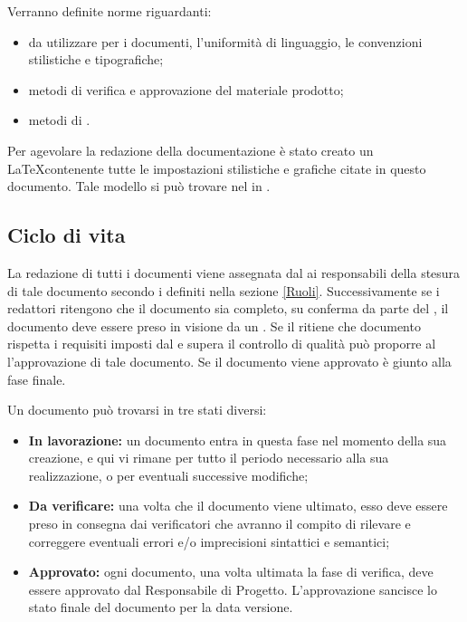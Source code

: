 \documentclass[12pt,a4paper]{article}
\begin{document}
Verranno definite norme riguardanti:
\begin{itemize}
	\item {} da utilizzare per i documenti, l'uniformità di linguaggio, le convenzioni stilistiche e tipografiche;
	\item metodi di verifica e approvazione del materiale prodotto;
	\item metodi di \textit{}.
\end{itemize}

Per agevolare la redazione della documentazione è stato creato un \textit{} \LaTeX contenente tutte le impostazioni stilistiche e grafiche citate in questo documento. Tale modello si può trovare nel  in .

\subsection{Ciclo di vita}

La redazione di tutti i documenti viene assegnata dal \PM{} ai responsabili della stesura di tale documento secondo i  definiti nella sezione \ref{Ruoli}. Successivamente se i redattori ritengono che il documento sia completo, su conferma da parte del \PM, il documento deve essere preso in visione da un \VR. Se il \VR{} ritiene che documento rispetta i requisiti imposti dal \PR{} e supera il controllo di qualità può proporre al \PM{} l'approvazione di tale documento. Se il documento viene approvato è giunto alla fase finale.

Un documento può trovarsi in tre stati diversi:
\begin{itemize}
	\item \textbf{In lavorazione:} un documento entra in questa fase nel momento della sua creazione, e qui vi rimane per tutto il periodo necessario alla sua realizzazione, o per eventuali successive modifiche;
	\item \textbf{Da verificare:} una volta che il documento viene ultimato, esso deve essere preso in consegna dai verificatori che avranno il compito di rilevare e correggere eventuali errori e/o imprecisioni sintattici e semantici;
	\item \textbf{Approvato:} ogni documento, una volta ultimata la fase di verifica, deve essere approvato dal Responsabile di Progetto. L’approvazione sancisce lo stato finale del documento per la data versione.
\end{itemize}
\end{document}
